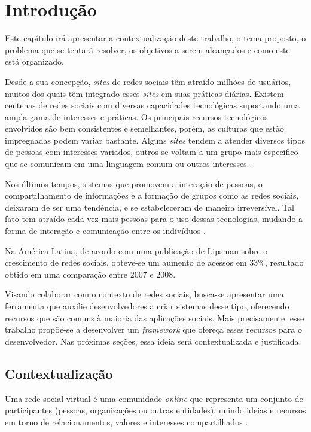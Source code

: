 \chapter[Introdução]{Introdução}

Este capítulo irá apresentar a contextualização deste trabalho, o tema proposto, o problema que se tentará resolver, os objetivos a serem alcançados e como este está organizado.

Desde a sua concepção, \textit{sites} de redes sociais têm atraído milhões de usuários, muitos dos quais têm integrado esses \textit{sites} em suas práticas diárias. Existem centenas de redes sociais com diversas capacidades tecnológicas suportando uma ampla gama de interesses e práticas. Os principais recursos tecnológicos envolvidos são bem consistentes e semelhantes, porém, as culturas que estão impregnadas podem variar bastante. Alguns \textit{sites} tendem a atender diversos tipos de pessoas com interesses variados, outros se voltam a um grupo mais específico que se comunicam em uma linguagem comum ou outros interesses \cite{Boyd:Ellison:2007}.

Nos últimos tempos, sistemas que promovem a interação de pessoas, o compartilhamento de informações e a formação de grupos como as redes sociais, deixaram de ser uma tendência, e se estabeleceram de maneira irreversível. Tal fato tem atraído cada vez mais pessoas para o uso dessas tecnologias, mudando a forma de interação e comunicação entre os indivíduos \cite{Santana:Melo-Solarte:Neris:Miranda:Baranauskas:2009}.

Na América Latina, de acordo com uma publicação de Lipsman \cite{Lipsman:2008} sobre o crescimento de redes sociais, obteve-se um aumento de acessos em 33\%, resultado obtido em uma comparação entre 2007 e 2008.

Visando colaborar com o contexto de redes sociais, busca-se apresentar uma ferramenta que auxilie desenvolvedores a criar sistemas desse tipo, oferecendo recursos que são comuns à maioria das aplicações sociais. Mais precisamente, esse trabalho propõe-se a desenvolver um \textit{framework} que ofereça esses recursos para o desenvolvedor. Nas próximas seções, essa ideia será contextualizada e justificada.

\section{Contextualização}

Uma rede social virtual é uma comunidade \textit{online} que representa um conjunto de participantes (pessoas, organizações ou outras entidades), unindo ideias e recursos em torno de relacionamentos, valores e interesses compartilhados \cite{Marteleto:2001}.

